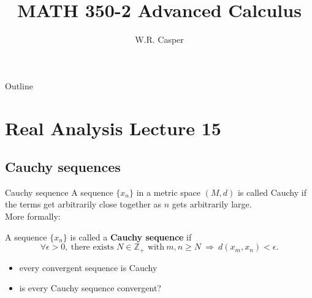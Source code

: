 \documentclass{beamer}
\title{MATH 350-2 Advanced Calculus}
\subtitle
{} %
\author[W.R. Casper] %
{W.R. Casper}
\institute[California State University Fullerton] %
{
  Department of Mathematics\\
  California State University Fullerton}
\begin{document}
\begin{frame}
  \titlepage
\end{frame}

\begin{frame}{Outline}
  \tableofcontents
\end{frame}



\section{Real Analysis Lecture 15}

\subsection{Cauchy sequences}

\begin{frame}{Cauchy sequence}
A sequence $\{x_n\}$ in a metric space $(M,d)$ is called Cauchy if the terms get arbitrarily close together as $n$ gets arbitrarily large.\\
\pause
More formally:
\pause
\begin{defn}
A sequence $\{x_n\}$ is called a \textbf{Cauchy sequence} if
$$\forall \epsilon > 0,\ \text{there exists $N\in\mathbb Z_{+}$ with}\ m,n\geq N\ \Rightarrow\ d(x_m,x_n) < \epsilon.$$
\end{defn}
\begin{itemize}
\pause
\item every convergent sequence is Cauchy
\pause
\item is every Cauchy sequence convergent?
\end{itemize}
\end{frame}
\end{document}
